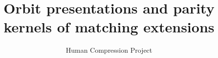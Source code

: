 
\title{Orbit presentations and parity kernels of matching extensions}
\author{Human Compression Project}
\date{}

\maketitle



